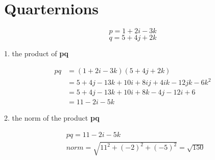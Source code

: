 \documentclass[12pt,letterpaper]{article}
\begin{document}
\section{Quarternions}
    $$p = 1 + 2i - 3k$$
    $$q = 5 + 4j + 2k$$

1. the product of \textbf{pq}

$$
    \begin{aligned}
        pq & = (1 + 2i - 3k)(5 + 4j + 2k)
        \\
        & = 5 + 4j - 13k + 10i + 8ij + 4ik - 12jk - 6k^{2}
        \\
        & = 5 + 4j -13k + 10i + 8k - 4j - 12i + 6
        \\
        & = 11 - 2i - 5k
    \end{aligned}
$$

2. the norm of the product \textbf{pq}

$$
    \begin{aligned}
        & pq = 11 - 2i - 5k
        \\
        & norm = \sqrt{11^{2} + (-2)^{2} + (-5)^{2}} = \sqrt{150}
    \end{aligned}
$$
\end{document}
